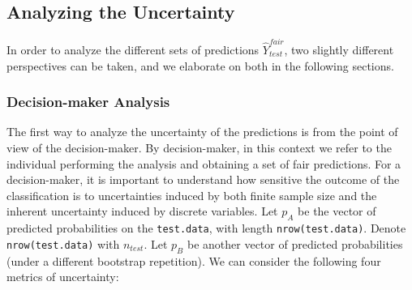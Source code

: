 \documentclass[
  nojss]{jss}
\begin{document}
\hypertarget{analyzing-the-uncertainty}{%
\subsection{Analyzing the Uncertainty}\label{analyzing-the-uncertainty}}

In order to analyze the different sets of predictions
\(\widehat{Y}^{fair}_{test}\), two slightly different perspectives can
be taken, and we elaborate on both in the following sections.

\hypertarget{decision-maker-analysis}{%
\subsubsection{Decision-maker Analysis}\label{decision-maker-analysis}}

The first way to analyze the uncertainty of the predictions is from the
point of view of the decision-maker. By decision-maker, in this context
we refer to the individual performing the analysis and obtaining a set
of fair predictions. For a decision-maker, it is important to understand
how sensitive the outcome of the classification is to uncertainties
induced by both finite sample size and the inherent uncertainty induced
by discrete variables. Let \(p_A\) be the vector of predicted
probabilities on the \texttt{test.data}, with length
\texttt{nrow(test.data)}. Denote \texttt{nrow(test.data)} with
\(n_{test}\). Let \(p_B\) be another vector of predicted probabilities
(under a different bootstrap repetition). We can consider the following
four metrics of uncertainty:
\end{document}
